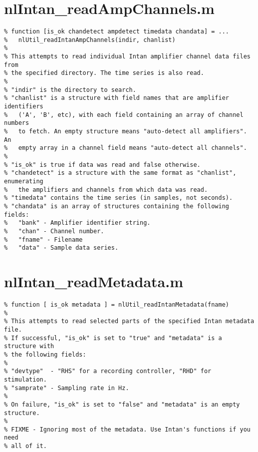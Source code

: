 \section{nlIntan\_readAmpChannels.m}

\begin{verbatim}
% function [is_ok chandetect ampdetect timedata chandata] = ...
%   nlUtil_readIntanAmpChannels(indir, chanlist)
%
% This attempts to read individual Intan amplifier channel data files from
% the specified directory. The time series is also read.
%
% "indir" is the directory to search.
% "chanlist" is a structure with field names that are amplifier identifiers
%   ('A', 'B', etc), with each field containing an array of channel numbers
%   to fetch. An empty structure means "auto-detect all amplifiers". An
%   empty array in a channel field means "auto-detect all channels".
%
% "is_ok" is true if data was read and false otherwise.
% "chandetect" is a structure with the same format as "chanlist", enumerating
%   the amplifiers and channels from which data was read.
% "timedata" contains the time series (in samples, not seconds).
% "chandata" is an array of structures containing the following fields:
%   "bank" - Amplifier identifier string.
%   "chan" - Channel number.
%   "fname" - Filename
%   "data" - Sample data series.
\end{verbatim}

\section{nlIntan\_readMetadata.m}

\begin{verbatim}
% function [ is_ok metadata ] = nlUtil_readIntanMetadata(fname)
%
% This attempts to read selected parts of the specified Intan metadata file.
% If successful, "is_ok" is set to "true" and "metadata" is a structure with
% the following fields:
%
% "devtype"  - "RHS" for a recording controller, "RHD" for stimulation.
% "samprate" - Sampling rate in Hz.
%
% On failure, "is_ok" is set to "false" and "metadata" is an empty structure.
%
% FIXME - Ignoring most of the metadata. Use Intan's functions if you need
% all of it.
\end{verbatim}

